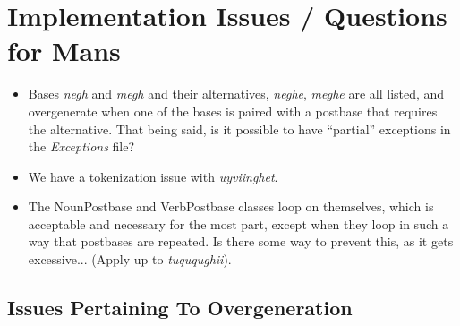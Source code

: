 \documentclass{article}
\begin{document}

\section{Implementation Issues / Questions for Mans}

\begin{itemize}
\renewcommand\labelitemi{$\cdot$}

\item Bases \textit{negh} and \textit{megh} and their alternatives, \textit{neghe}, \textit{meghe} are all listed, and overgenerate when one of the bases is paired with a postbase that requires the alternative.
%
That being said, is it possible to have ``partial'' exceptions in the \textit{Exceptions} file?

\item We have a tokenization issue with \textit{uyviinghet}.

\item The NounPostbase and VerbPostbase classes loop on themselves, which is acceptable and necessary for the most part, except when they loop in such a way that postbases are repeated.
%
Is there some way to prevent this, as it gets excessive... (Apply up to \textit{tuququghii}).

\end{itemize}

\subsection{Issues Pertaining To Overgeneration}
\end{document}
